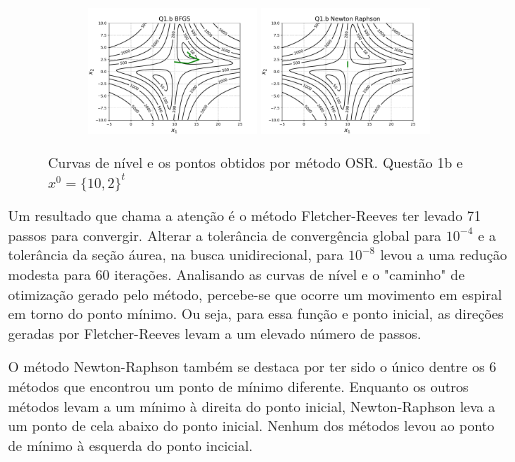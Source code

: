 \documentclass[10pt, a4paper]{article}
\begin{document}
\begin{figure}[H]
\begin{subfigure}[b]{\textwidth}
  \end{subfigure}
  \begin{subfigure}[b]{\textwidth}
    \includegraphics[width=0.49\textwidth]{figuras/Q1.b_BFGS_P0=[10e2].pdf}
    \includegraphics[width=0.49\textwidth]{figuras/Q1.b_Newton Raphson_P0=[10e2].pdf}
  \end{subfigure}
  \caption{Curvas de nível e os pontos obtidos por método OSR. Questão 1b e $x^0 = \{10,2\}^t$}
\end{figure}

Um resultado que chama a atenção é o método Fletcher-Reeves ter levado 71 passos para convergir. Alterar a tolerância
de convergência global para $10^{-4}$ e a tolerância da seção áurea, na busca unidirecional, para $10^{-8}$ levou a uma
redução modesta para 60 iterações. Analisando as curvas de nível e o "caminho" de otimização gerado pelo método,
percebe-se que ocorre um movimento em espiral em torno do ponto mínimo. Ou seja, para essa função e ponto inicial,
as direções geradas por Fletcher-Reeves levam a um elevado número de passos.

O método Newton-Raphson também se destaca por ter sido o único dentre os 6 métodos que encontrou um ponto de mínimo diferente.
Enquanto os outros métodos levam a um mínimo à direita do ponto inicial, Newton-Raphson leva a um ponto de cela abaixo do 
ponto inicial. Nenhum dos métodos levou ao ponto de mínimo à esquerda do ponto incicial.
\end{document}
